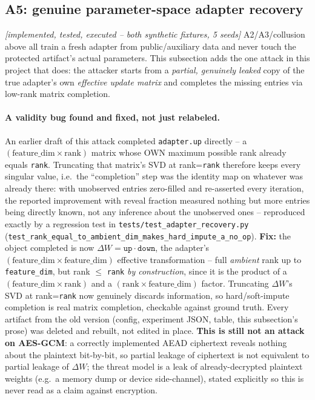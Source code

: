 \documentclass[11pt]{article}
\newcommand{\status}[1]{\textit{[#1]}}
\begin{document}
\subsection{A5: genuine parameter-space adapter recovery}
\label{sec:adapter-recovery}
\status{implemented, tested, executed -- both synthetic fixtures, 5 seeds}
A2/A3/collusion above all train a fresh adapter from public/auxiliary data
and never touch the protected artifact's actual parameters. This subsection
adds the one attack in this project that does: the attacker starts from a
\emph{partial, genuinely leaked} copy of the true adapter's own
\emph{effective update matrix} and completes the missing entries via
low-rank matrix completion.

\paragraph{A validity bug found and fixed, not just relabeled.} An earlier
draft of this attack completed \texttt{adapter.up} directly -- a
$(\text{feature\_dim} \times \text{rank})$ matrix whose OWN maximum
possible rank already equals \texttt{rank}. Truncating that matrix's SVD at
rank=\texttt{rank} therefore keeps every singular value, i.e.\ the
``completion'' step was the identity map on whatever was already there:
with unobserved entries zero-filled and re-asserted every iteration, the
reported improvement with reveal fraction measured nothing but more
entries being directly known, not any inference about the unobserved ones
-- reproduced exactly by a regression test in
\texttt{tests/test\_adapter\_recovery.py}
(\texttt{test\_rank\_equal\_to\_ambient\_dim\_makes\_hard\_impute\_a\_no\_op}).
\textbf{Fix:} the object completed is now
$\Delta W = \texttt{up} \cdot \texttt{down}$, the adapter's
$(\text{feature\_dim} \times \text{feature\_dim})$ effective transformation
-- full \emph{ambient} rank up to \texttt{feature\_dim}, but rank
$\le$ \texttt{rank} \emph{by construction}, since it is the product of a
$(\text{feature\_dim}\times\text{rank})$ and a
$(\text{rank}\times\text{feature\_dim})$ factor. Truncating $\Delta W$'s
SVD at rank=\texttt{rank} now genuinely discards information, so
hard/soft-impute completion is real matrix completion, checkable against
ground truth. Every artifact from the old version (config, experiment
JSON, table, this subsection's prose) was deleted and rebuilt, not
edited in place. \textbf{This is still not an attack on AES-GCM}: a
correctly implemented AEAD ciphertext reveals nothing about the plaintext
bit-by-bit, so partial leakage of ciphertext is not equivalent to partial
leakage of $\Delta W$; the threat model is a leak of already-decrypted
plaintext weights (e.g.\ a memory dump or device side-channel), stated
explicitly so this is never read as a claim against encryption.
\end{document}
